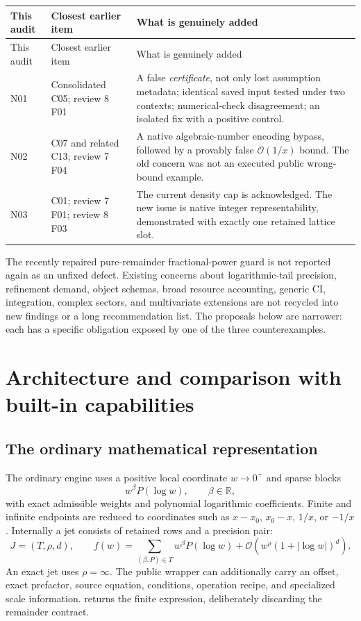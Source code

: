\documentclass[11pt,a4paper]{article}
\newcommand{\code}[1]{\texttt{\detokenize{#1}}}
\newcommand{\OO}{\mathcal O}
\newcommand{\RR}{\mathbb R}
\begin{document}
\begin{longtable}{@{}P{0.11\textwidth}P{0.25\textwidth}P{0.56\textwidth}@{}}
\toprule This audit & Closest earlier item & What is genuinely added\\\midrule\endfirsthead
\toprule This audit & Closest earlier item & What is genuinely added\\\midrule\endhead
N01 & Consolidated C05; review 8 F01 & A false \emph{certificate}, not only lost assumption metadata; identical saved input tested under two contexts; numerical-check disagreement; an isolated fix with a positive control.\\
N02 & C07 and related C13; review 7 F04 & A native algebraic-number encoding bypass, followed by a provably false \(\OO(1/x)\) bound. The old concern was not an executed public wrong-bound example.\\
N03 & C01; review 7 F01; review 8 F03 & The current density cap is acknowledged. The new issue is native integer representability, demonstrated with exactly one retained lattice slot.\\
\bottomrule
\end{longtable}

The recently repaired pure-remainder fractional-power guard is not reported again as an unfixed defect. Existing concerns about logarithmic-tail precision, refinement demand, object schemas, broad resource accounting, generic CI, integration, complex sectors, and multivariate extensions are not recycled into new findings or a long recommendation list. The proposals below are narrower: each has a specific obligation exposed by one of the three counterexamples.

\section{Architecture and comparison with built-in capabilities}\label{sec:comparison}

\subsection{The ordinary mathematical representation}
The ordinary engine uses a positive local coordinate \(w\to0^+\) and sparse blocks
\[
 w^\beta P(\log w),\qquad \beta\in\RR,
\]
with exact admissible weights and polynomial logarithmic coefficients. Finite and infinite endpoints are reduced to coordinates such as \(x-x_0\), \(x_0-x\), \(1/x\), or \(-1/x\). Internally a jet consists of retained rows and a precision pair:
\[
 J=(T,\rho,d),\qquad
 f(w)=\sum_{(\beta,P)\in T}w^\beta P(\log w)
       +\OO\!\left(w^\rho(1+|\log w|)^d\right).
\]
An exact jet uses \(\rho=\infty\). The public \code{GeneralizedSeries} wrapper can additionally carry an offset, exact prefactor, source equation, conditions, operation recipe, and specialized scale information. \code{Normal} returns the finite expression, deliberately discarding the remainder contract.\cite{repo-main,repo-operations,repo-readme}
\end{document}

